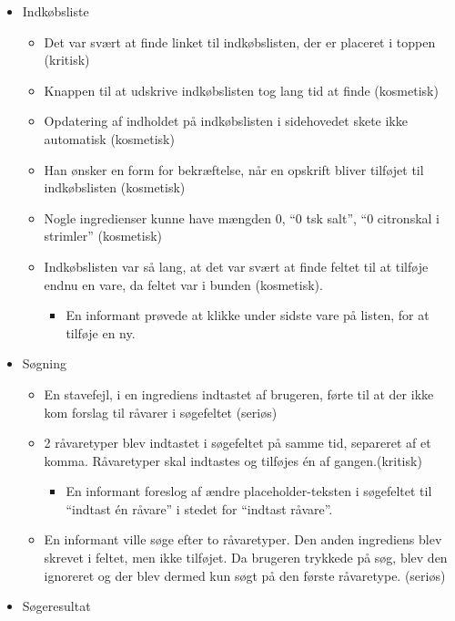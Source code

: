  \begin{itemize}[noitemsep]
 \item Indkøbsliste
  \begin{itemize}[noitemsep]
  \item Det var svært at finde linket til indkøbslisten, der er placeret i toppen (kritisk)
  \item Knappen til at udskrive indkøbslisten tog lang tid at finde (kosmetisk)
  \item Opdatering af indholdet på indkøbslisten i sidehovedet skete ikke automatisk (kosmetisk)
  \item Han ønsker en form for bekræftelse, når en opskrift bliver tilføjet til indkøbslisten (kosmetisk)
  \item Nogle ingredienser kunne have mængden 0, \fx “0 tsk salt”, “0 citronskal i strimler” (kosmetisk)
  \item Indkøbslisten var så lang, at det var svært at finde feltet til at tilføje endnu en vare, da feltet var i bunden (kosmetisk).
   \begin{itemize}[noitemsep]
   \item En informant prøvede at klikke under sidste vare på listen, for at tilføje en ny.
   \end{itemize}
  \end{itemize}
 \item Søgning
  \begin{itemize}[noitemsep]
  \item En stavefejl, i en ingrediens indtastet af brugeren, førte til at der ikke kom forslag til råvarer i søgefeltet (seriøs)
  \item 2 råvaretyper blev indtastet i søgefeltet på samme tid, separeret af et komma. Råvaretyper skal indtastes og tilføjes én af gangen.(kritisk)
   \begin{itemize}[noitemsep]
   \item En informant foreslog af ændre placeholder-teksten i søgefeltet til ``indtast én råvare'' i stedet for ``indtast råvare''.
   \end{itemize}
  \item En informant ville søge efter to råvaretyper. Den anden ingrediens blev skrevet i feltet, men ikke tilføjet. Da brugeren trykkede på søg, blev den ignoreret og der blev dermed kun søgt på den første råvaretype. (seriøs)
  \end{itemize}
 \item Søgeresultat
   \begin{itemize}[noitemsep]

\end{itemize}
\end{itemize}
